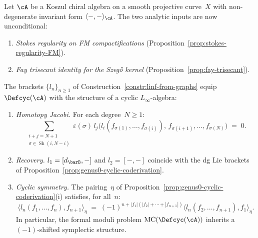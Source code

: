 \begin{theorem}\label{thm:cyclic-linf-graph}
Let $\cA$ be a Koszul chiral algebra on a smooth projective
curve~$X$ with non-degenerate invariant form
$\langle{-},{-}\rangle_{\cA}$.
The two analytic inputs are now unconditional:
\begin{enumerate}[label=\textup{(H\arabic*)}]
\item\label{hyp:stokes-FM}
 \emph{Stokes regularity on FM compactifications}
 \textup{(}Proposition~\textup{\ref{prop:stokes-regularity-FM}}\textup{)}.
\item\label{hyp:fay-propagator}
 \emph{Fay trisecant identity for the Szeg\H{o} kernel}
 \textup{(}Proposition~\textup{\ref{prop:fay-trisecant}}\textup{)}.
\end{enumerate}
The brackets $\{l_n\}_{n \geq 1}$ of
Construction~\textup{\ref{constr:linf-from-graphs}} equip
$\Defcyc(\cA)$ with the structure of a cyclic $L_\infty$-algebra:
\begin{enumerate}[label=\textup{(\alph*)}]
\item \emph{Homotopy Jacobi.}
 For each degree~$N \geq 1$:
 \begin{equation}\label{eq:homotopy-jacobi-graph}
 \sum_{\substack{i + j = N + 1 \\
 \sigma \in \operatorname{Sh}(i,N-i)}}
 \varepsilon(\sigma)\,
 l_j\bigl(l_i(f_{\sigma(1)}, \ldots, f_{\sigma(i)}),\,
 f_{\sigma(i+1)}, \ldots, f_{\sigma(N)}\bigr) \;=\; 0.
 \end{equation}
\item \emph{Recovery.}
 $l_1 = [d_{\barB}, -]$ and
 $l_2 = [-,-]$ coincide with the dg Lie brackets of
 Proposition~\textup{\ref{prop:genus0-cyclic-coderivation}}.
\item \emph{Cyclic symmetry.}
 The pairing~$\eta$ of
 Proposition~\textup{\ref{prop:genus0-cyclic-coderivation}(i)}
 satisfies, for all~$n$:
 \begin{equation}\label{eq:cyclic-symmetry-graph}
 \langle l_n(f_1, \ldots, f_n), f_{n+1}\rangle_\eta
 \;=\;
 (-1)^{n + |f_1|(|f_2|+\cdots+|f_{n+1}|)}
 \langle l_n(f_2, \ldots, f_{n+1}), f_1\rangle_\eta.
 \end{equation}
 In particular, the formal moduli problem
 $\operatorname{MC}(\Defcyc(\cA))$ inherits a $(-1)$-shifted
 symplectic structure.
\end{enumerate}
\end{theorem}

